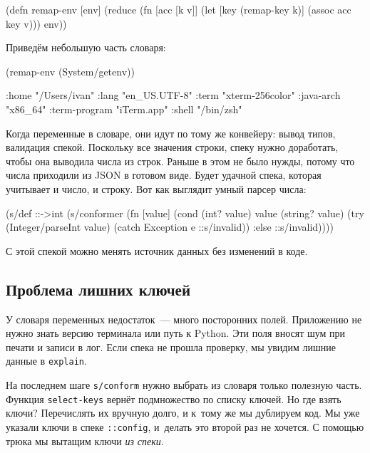 \begin{english}
  \begin{clojure}
(defn remap-env [env]
  (reduce
   (fn [acc [k v]]
     (let [key (remap-key k)]
       (assoc acc key v)))
   {}
   env))
  \end{clojure}
\end{english}

\noindent
Приведём небольшую часть словаря:

\begin{english}
  \begin{clojure}
(remap-env (System/getenv))

{:home "/Users/ivan"
 :lang "en_US.UTF-8"
 :term "xterm-256color"
 :java-arch "x86_64"
 :term-program "iTerm.app"
 :shell "/bin/zsh"}
  \end{clojure}
\end{english}

Когда переменные в словаре, они идут по тому же конвейеру: вывод типов,
валидация спекой. Поскольку все значения строки, спеку нужно доработать, чтобы
она выводила числа из строк. Раньше в этом не было нужды, потому что числа
приходили из JSON в готовом виде. Будет удачной спека, которая учитывает и
число, и строку. Вот как выглядит умный парсер числа:

\begin{english}
  \begin{clojure}
(s/def ::->int
  (s/conformer
   (fn [value]
     (cond
       (int? value) value
       (string? value)
       (try (Integer/parseInt value)
            (catch Exception e
              ::s/invalid))
       :else ::s/invalid))))
  \end{clojure}
\end{english}

\noindent
С этой спекой можно менять источник данных без изменений в коде.

\subsection{Проблема лишних ключей}

У словаря переменных недостаток~--- много посторонних полей. Приложению не нужно
знать версию терминала или путь к Python. Эти поля вносят шум при печати и
записи в лог. Если спека не прошла проверку, мы увидим лишние данные в
\verb|explain|.


На последнем шаге \verb|s/conform| нужно выбрать из словаря только полезную
часть. Функция \verb|select-keys| вернёт подмножество по списку ключей. Но где
взять ключи? Перечислять их вручную долго, и к~тому же мы дублируем код. Мы уже
указали ключи в спеке \verb|::config|, и~делать это второй раз не хочется. С
помощью трюка мы вытащим ключи \emph{из спеки}.

